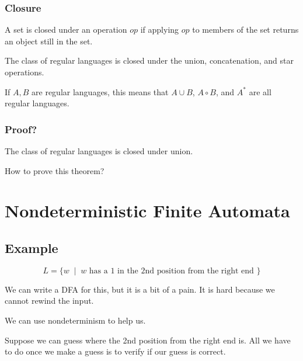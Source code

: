\documentclass[xcolor=table]{beamer}
\begin{document}
\begin{frame}
  \frametitle{Closure}

  \begin{Definition}
    A set is \alert{closed under an operation} $op$ if applying $op$
      to members of the set returns an object still in the set.
  \end{Definition}

  \bigskip
  
  \begin{Theorem}
    The class of regular languages is closed under the union,
      concatenation, and star operations.
  \end{Theorem}

  \bigskip
  If $A,B$ are regular languages, this means that $A\cup B$, $A \circ
  B$, and $A^*$ are all regular languages.
\end{frame}

\begin{frame}
  \frametitle{Proof?}

  \begin{Theorem}
    The class of regular languages is closed under union.
  \end{Theorem}  

  \bigskip
  How to prove this theorem?
\end{frame}

\section[Nondeterministic Finite Automata]{Nondeterministic Finite Automata}

\subsection[example]{Example}

\begin{frame}
  \begin{block}{}
    \[ L = \{ w \; \mid \; w \mbox{ has a 1 in the 2nd position from the
    right end } \} \]
  \end{block}

  We can write a DFA for this, but it is a bit of a pain. It is hard
  because we cannot rewind the input.

  \bigskip
  We can use nondeterminism to help us.

  \bigskip

  Suppose we can \alert{guess} where the 2nd position from the right
  end is. All we have to do once we make a guess is to \alert{verify}
  if our guess is correct.

\end{frame}
\end{document}
